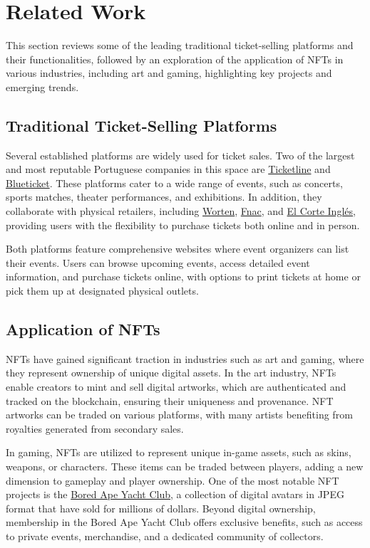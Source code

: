 \section{Related Work}
\label{sec:related_work}

This section reviews some of the leading traditional ticket-selling platforms
and their functionalities, followed by an exploration of the application of
NFTs in various industries, including art and gaming, highlighting
key projects and emerging trends.

\subsection{Traditional Ticket-Selling Platforms}
\label{subsec:traditional_ticket_selling_platforms}

Several established platforms are widely used for ticket sales. Two of the
largest and most reputable Portuguese companies in this space are
\href{https://ticketline.sapo.pt/}{Ticketline} and
\href{https://blueticket.meo.pt/}{Blueticket}. These platforms cater to a wide
range of events, such as concerts, sports matches, theater performances, and
exhibitions. In addition, they collaborate with physical retailers, including
\href{https://www.worten.pt/}{Worten}, \href{https://www.fnac.pt/}{Fnac}, and
\href{https://www.elcorteingles.pt/}{El Corte Inglés}, providing users with the
flexibility to purchase tickets both online and in person.

Both platforms feature comprehensive websites where event organizers can list
their events. Users can browse upcoming events, access detailed event
information, and purchase tickets online, with options to print tickets at home
or pick them up at designated physical outlets.


\subsection{Application of NFTs}
\label{subsec:application_of_nfts}

NFTs have gained significant traction in industries such as art and gaming,
where they represent ownership of unique digital assets. In the art industry,
NFTs enable creators to mint and sell digital artworks, which are authenticated
and tracked on the blockchain, ensuring their uniqueness and provenance. NFT
artworks can be traded on various platforms, with many artists benefiting from
royalties generated from secondary sales.

In gaming, NFTs are utilized to represent unique in-game assets, such as skins,
weapons, or characters. These items can be traded between players, adding a new
dimension to gameplay and player ownership. One of the most notable NFT
projects is the \href{https://www.boredapeyachtclub.com/}{Bored Ape Yacht
    Club}, a collection of digital avatars in JPEG format that have sold for
millions of dollars. Beyond digital ownership, membership in the Bored Ape
Yacht Club offers exclusive benefits, such as access to private events,
merchandise, and a dedicated community of collectors.
